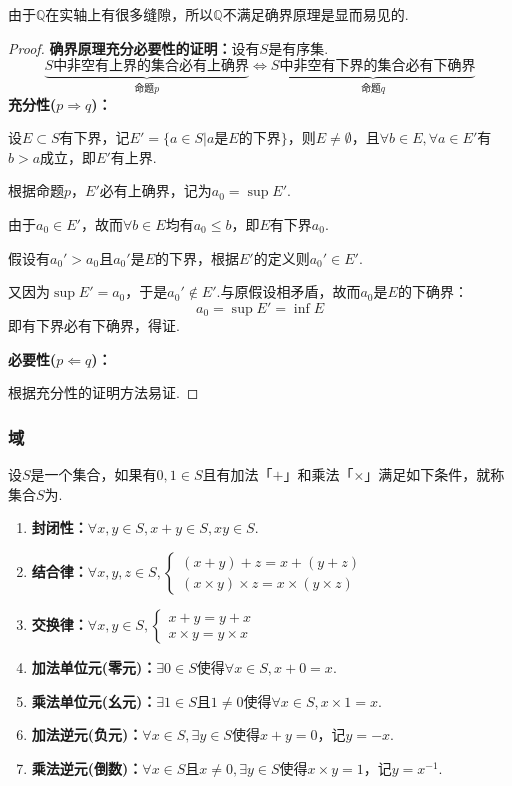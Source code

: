 由于$\mathbb{Q}$在实轴上有很多缝隙，所以$\mathbb{Q}$不满足确界原理是显而易见的.

\begin{proof}
    \textbf{确界原理充分必要性的证明：}设有$S$是有序集.
    \[\underbrace{\text{$S$中非空有上界的集合必有上确界}}_\text{命题$p$}\Leftrightarrow\underbrace{\text{$S$中非空有下界的集合必有下确界}}_\text{命题$q$}\]
    \textbf{充分性($p \Rightarrow q$)：}
    
    设$E \subset S$有下界，记$E' = \{a \in S |a\text{是}E\text{的下界}\}$，则$E \neq \emptyset$，且$\forall b \in E, \forall a \in E'$有$b>a$成立，即$E'$有上界.

    根据命题$p$，$E'$必有上确界，记为$a_0 = \sup E'$.
    
    由于$a_0 \in E'$，故而$\forall b \in E$均有$a_0 \leqslant b$，即$E$有下界$a_0$.

    假设有$a_0'>a_0$且$a_0'$是$E$的下界，根据$E'$的定义则$a_0' \in E'$.

    又因为$\sup E' = a_0$，于是$a_0' \notin E'$.与原假设相矛盾，故而$a_0$是$E$的下确界：
    \[a_0 = \sup E' = \inf E\]
    即有下界必有下确界，得证.

    \textbf{必要性($p \Leftarrow q$)：}

    根据充分性的证明方法易证.

\end{proof}

\subsubsection{域}
\begin{definition}
    设$S$是一个集合，如果有$0,1 \in S$且有加法「$+$」和乘法「$\times$」满足如下条件，就称集合$S$为.
    \begin{enumerate}[circ]
        \item \textbf{封闭性：}$\forall x,y \in S, x+y \in S, xy \in S$.
        \item \textbf{结合律：}$\forall x,y,z \in S,\begin{cases}
            (x + y) + z = x + (y + z) \\
            (x \times y) \times z = x \times (y \times z)
        \end{cases}$
        \item \textbf{交换律：}$\forall x,y \in S,\begin{cases}
            x + y = y + x\\
            x \times y = y \times x
        \end{cases}$
        \item \textbf{加法单位元(零元)：}$\exists 0 \in S$使得$\forall x \in S, x+0=x$.
        \item \textbf{乘法单位元(幺元)：}$\exists 1 \in S$且$1 \neq 0$使得$\forall x \in S, x \times 1 = x$.
        \item \textbf{加法逆元(负元)：}$\forall x \in S, \exists y \in S$使得$x+y=0$，记$y=-x$.
        \item \textbf{乘法逆元(倒数)：}$\forall x \in S$且$x \neq 0, \exists y \in S$使得$x \times y=1$，记$y=x^{-1}$.
    \end{enumerate}
\end{definition}

